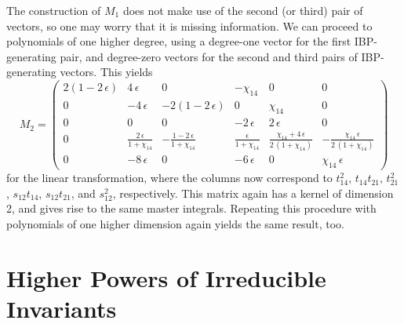 \documentclass[aps,prd,preprint,groupedaddress,nofootinbib,showpacs,eqsecnum]{revtex4}
\def\eps{\epsilon}
\begin{document}
The construction of $M_1$ does not make use of the second (or third) pair
of vectors, so one may worry that it is missing information.  We can
proceed to polynomials of one higher degree, using
a degree-one vector  for the first IBP-generating pair, and degree-zero vectors
for the second and third pairs of IBP-generating vectors.  This yields
\begin{equation}
M_2 =
\left(\begin{matrix} 
2(1-2\,\eps) & 4\,\eps & 0 & -\chi_{14} & 0 & 0 \\
0 & -4\,\eps & -2(1-2\,\eps) & 0 & \chi_{14} & 0 \\
0 & 0 & 0 & -2\,\eps & 2\,\eps & 0 \\
0 & \frac{2\,\eps}{1+\chi_{14}} & -\frac{1-2\,\eps}{1+\chi_{14}} & 
\frac{\eps}{1+\chi_{14}} & \frac{\chi_{14}+4\,\eps}{2\,(1+\chi_{14})} &
-\frac{\chi_{14}\,\eps}{2\,(1+\chi_{14})} \\
0 & -8\,\eps & 0 & -6\,\eps & 0 & \chi_{14}\,\eps
\end{matrix}\right)
\label{MasterMatrix2}
\end{equation}
for the linear transformation, where the columns now correspond to
$t_{14}^2$, $t_{14} t_{21}$, $t_{21}^2$, $s_{12} t_{14}$,
$s_{12} t_{21}$, and $s_{12}^2$, respectively.
This matrix again has a kernel of dimension 2, and gives rise to the same
master integrals.  Repeating this procedure with polynomials of one
higher dimension again yields the same result, too.

\section{Higher Powers of Irreducible Invariants}
\label{HigherPowersSection}
\end{document}
